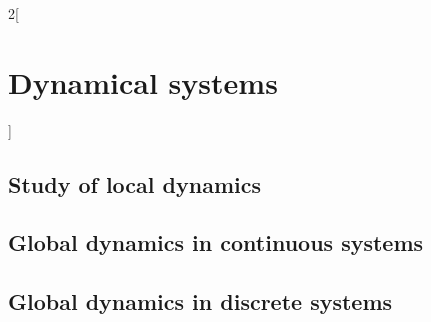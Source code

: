 \documentclass[../../../main.tex]{subfiles}
\begin{document}
\begin{multicols}{2}[\section{Dynamical systems}]
  \subsection{Study of local dynamics}
  \subsection{Global dynamics in continuous systems}
  \subsection{Global dynamics in discrete systems}
\end{multicols}
\end{document}
